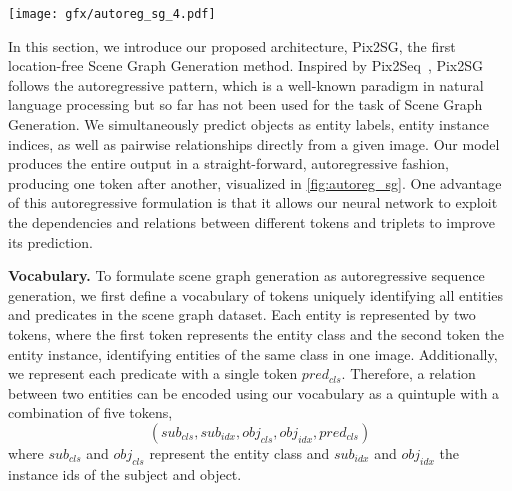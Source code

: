 \documentclass[10pt,twocolumn,letterpaper]{article}
\begin{document}
\begin{figure*}[t]
  \centering
  
   \texttt{[image: gfx/autoreg\_sg\_4.pdf]}

   \caption{Pix2SG Architecture: An image encoder encodes the image as a feature map that is flattened and used as the input sequence to the Autoregressive Transformer module. The Autoregressive Transformer predicts the components of the scene graph, token by token, considering all its previous predictions until the output SG-sequence is completed.}
   \label{fig:autoreg_sg}
\end{figure*}

In this section, we introduce our proposed architecture, Pix2SG, the first location-free Scene Graph Generation method.
Inspired by Pix2Seq~\cite{chen_pix2seq_2022}, Pix2SG follows the autoregressive pattern, which is a well-known paradigm in natural language processing but so far has not been used for the task of Scene Graph Generation. We simultaneously predict objects as entity labels, entity instance indices, as well as pairwise relationships directly from a given image. Our model produces the entire output in a straight-forward, autoregressive fashion, producing one token after another, visualized in \cref{fig:autoreg_sg}. One advantage of this autoregressive formulation is that it allows our neural network to exploit the dependencies and relations between different tokens and triplets to improve its prediction. 

\noindent\textbf{Vocabulary.} To formulate scene graph generation as autoregressive sequence generation, we first define a vocabulary of tokens uniquely identifying all entities and predicates in the scene graph dataset. Each entity is represented by two tokens, where the first token represents the entity class and the second token the entity instance, identifying entities of the same class in one image. Additionally, we represent each predicate with a single token $pred_{cls}$. Therefore, a relation between two entities can be encoded using our vocabulary as a quintuple with a combination of five tokens, 
\begin{equation} \label{SceneGraphQuintupel} (sub_{cls},sub_{idx},obj_{cls},obj_{idx},pred_{cls}) \end{equation}
where $sub_{cls}$ and $obj_{cls}$ represent the entity class and $sub_{idx}$ and $obj_{idx}$ the instance ids of the subject and object. 
\end{document}
